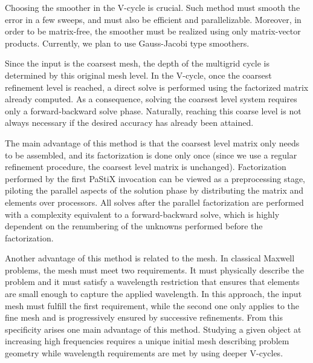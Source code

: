 \documentclass{report}
\begin{document}
Choosing the smoother in the V-cycle is crucial. Such method must
smooth the error in a few sweeps, and must also be efficient and
parallelizable. Moreover, in order to be matrix-free, the smoother
must be realized using only matrix-vector products. Currently, we plan
to use Gauss-Jacobi type smoothers.

Since the input is the coarsest mesh, the depth of the multigrid cycle
is determined by this original mesh level. In the V-cycle, once the
coarsest refinement level is reached, a direct solve is performed
using the factorized matrix already computed. As a consequence,
solving the coarsest level system requires only a forward-backward
solve phase. Naturally, reaching this coarse level is not always
necessary if the desired accuracy has already been attained.

The main advantage of this method is that the coarsest level matrix
only needs to be assembled, and its factorization is done only once
(since we use a regular refinement procedure, the coarsest level
matrix is unchanged). Factorization performed by the first PaStiX
invocation can be viewed as a preprocessing stage, piloting the
parallel aspects of the solution phase by distributing the matrix and elements
over processors. All solves after the parallel factorization are
performed with a complexity equivalent to a forward-backward
solve, which is highly dependent on the renumbering of the unknowns performed
before the factorization.

Another advantage of this method is related to the mesh. In
classical Maxwell problems, the mesh must meet two
requirements. It must physically describe the problem and it must
satisfy a wavelength restriction that ensures that elements are
small enough to capture the applied wavelength. In this approach, the
input mesh must fulfill the first requirement, while the second one
only applies to the fine mesh and is progressively ensured by
successive refinements. From this specificity arises one main
advantage of this method. Studying a given object at increasing high
frequencies requires a unique initial mesh describing problem geometry
while wavelength requirements are met by using deeper V-cycles.
\end{document}
